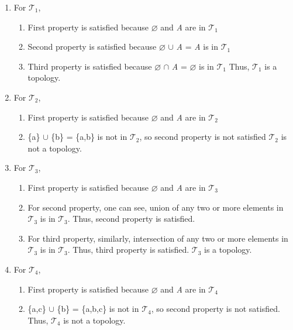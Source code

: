 \documentclass[11pt]{article}
\begin{document}
\begin{enumerate}
\item For $\mathcal{T}_1$,
\begin{enumerate}
    \item First property is satisfied because $\varnothing$ and \emph{A} are in $\mathcal{T}_1$
    \item Second property is satisfied because $\varnothing$ $\cup$ \emph{A} = \emph{A} is in $\mathcal{T}_1$
    \item Third property is satisfied because $\varnothing$ $\cap$ \emph{A} = $\varnothing$ is in $\mathcal{T}_1$\newline \newline
    Thus, $\mathcal{T}_1$ is a topology.
\end{enumerate}
\item For $\mathcal{T}_2$,
\begin{enumerate}
    \item First property is satisfied because $\varnothing$ and \emph{A} are in $\mathcal{T}_2$
    \item \{a\} $\cup$ \{b\} = \{a,b\} is not in $\mathcal{T}_2$, so second property is not satisfied \newline \newline
    $\mathcal{T}_2$ is not a topology.
\end{enumerate}
\item For $\mathcal{T}_3$,
\begin{enumerate}
    \item First property is satisfied because $\varnothing$ and \emph{A} are in $\mathcal{T}_3$
    \item For second property, one can see, union of any two or more elements in $\mathcal{T}_3$ is in $\mathcal{T}_3$. Thus, second property is satisfied.
    \item For third property, similarly, intersection of any two or more elements in $\mathcal{T}_3$ is in $\mathcal{T}_3$. Thus, third property is satisfied. \newline \newline
    $\mathcal{T}_3$ is a topology.
\end{enumerate}
\item For $\mathcal{T}_4$,
\begin{enumerate}
    \item First property is satisfied because $\varnothing$ and \emph{A} are in $\mathcal{T}_4$
    \item \{a,c\} $\cup$ \{b\} = \{a,b,c\} is not in $\mathcal{T}_4$, so second property is not satisfied. \newline \newline
    Thus, $\mathcal{T}_4$ is not a topology.
\end{enumerate}
\end{enumerate}
\newpage
\end{document}
